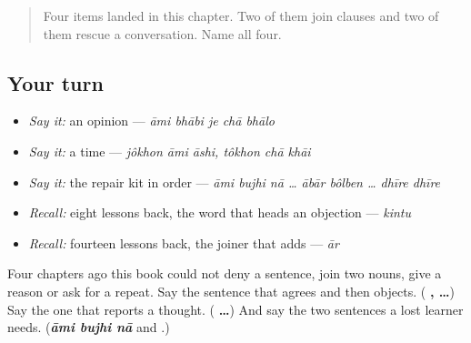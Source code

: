 \label{lesson:BN-R19-lost-and-found}



\begin{quote}
Four items landed in this chapter. Two of them join clauses and two of them rescue a conversation. Name all four.
\end{quote}

\subsection*{Your turn}
\begin{itemize}
\raggedright
  \item \emph{Say it:} an opinion — \emph{āmi bhābi je chā bhālo}
  \item \emph{Say it:} a time — \emph{jôkhon āmi āshi, tôkhon chā khāi}
  \item \emph{Say it:} the repair kit in order — \emph{āmi bujhi nā … ābār bôlben … dhīre dhīre}
  \item \emph{Recall:} eight lessons back, the word that heads an objection — \emph{kintu}
  \item \emph{Recall:} fourteen lessons back, the joiner that adds — \emph{ār}
\end{itemize}

\begin{tcolorbox}[breakable,colback=teal!4,colframe=teal!35!black,title={Before you move on}]
Four chapters ago this book could not deny a sentence, join two nouns, give a reason or ask for a repeat. Say the sentence that agrees and then objects. (\textbf{ ,  …}) Say the one that reports a thought. (\textbf{   …}) And say the two sentences a lost learner needs. (\emph{\textbf{āmi bujhi nā}} and \textbf{ }.)
\end{tcolorbox}
